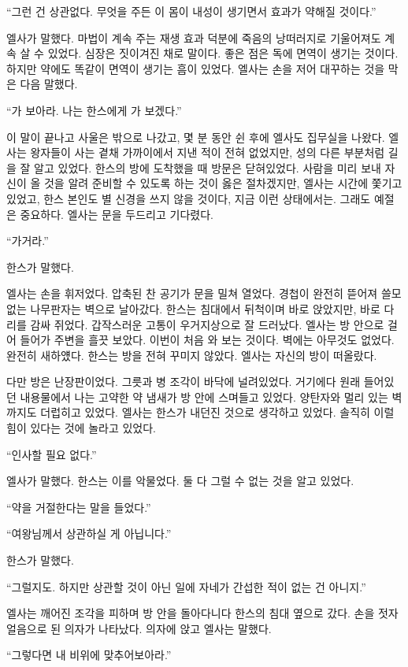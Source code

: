 ``그런 건 상관없다. 무엇을 주든 이 몸이 내성이 생기면서 효과가 약해질 것이다.''

엘사가 말했다. 마법이 계속 주는 재생 효과 덕분에 죽음의 낭떠러지로 기울어져도 계속 살 수 있었다. 심장은 짓이겨진 채로 말이다. 좋은 점은 독에 면역이 생기는 것이다. 하지만 약에도 똑같이 면역이 생기는 흠이 있었다. 엘사는 손을 저어 대꾸하는 것을 막은 다음 말했다.

``가 보아라. 나는 한스에게 가 보겠다.''

이 말이 끝나고 사울은 밖으로 나갔고, 몇 분 동안 쉰 후에 엘사도 집무실을 나왔다. 엘사는 왕자들이 사는 곁채 가까이에서 지낸 적이 전혀 없었지만, 성의 다른 부분처럼 길을 잘 알고 있었다. 한스의 방에 도착했을 때 방문은 닫혀있었다. 사람을 미리 보내 자신이 올 것을 알려 준비할 수 있도록 하는 것이 옳은 절차겠지만, 엘사는 시간에 쫓기고 있었고, 한스 본인도 별 신경을 쓰지 않을 것이다, 지금 이런 상태에서는. 그래도 예절은 중요하다. 엘사는 문을 두드리고 기다렸다.

``가거라.''

한스가 말했다.

엘사는 손을 휘저었다. 압축된 찬 공기가 문을 밀쳐 열었다. 경첩이 완전히 뜯어져 쓸모없는 나무판자는 벽으로 날아갔다. 한스는 침대에서 뒤척이며 바로 앉았지만, 바로 다리를 감싸 쥐었다. 갑작스러운 고통이 우거지상으로 잘 드러났다. 엘사는 방 안으로 걸어 들어가 주변을 흘끗 보았다. 이번이 처음 와 보는 것이다. 벽에는 아무것도 없었다. 완전히 새하얬다. 한스는 방을 전혀 꾸미지 않았다. 엘사는 자신의 방이 떠올랐다.

다만 방은 난장판이었다. 그릇과 병 조각이 바닥에 널려있었다. 거기에다 원래 들어있던 내용물에서 나는 고약한 약 냄새가 방 안에 스며들고 있었다. 양탄자와 멀리 있는 벽까지도 더럽히고 있었다. 엘사는 한스가 내던진 것으로 생각하고 있었다. 솔직히 이럴 힘이 있다는 것에 놀라고 있었다.

``인사할 필요 없다.''

엘사가 말했다. 한스는 이를 악물었다. 둘 다 그럴 수 없는 것을 알고 있었다.

``약을 거절한다는 말을 들었다.''

``여왕님께서 상관하실 게 아닙니다.''

한스가 말했다.

``그럴지도. 하지만 상관할 것이 아닌 일에 자네가 간섭한 적이 없는 건 아니지.''

엘사는 깨어진 조각을 피하며 방 안을 돌아다니다 한스의 침대 옆으로 갔다. 손을 젓자 얼음으로 된 의자가 나타났다. 의자에 앉고 엘사는 말했다.

``그렇다면 내 비위에 맞추어보아라.''

